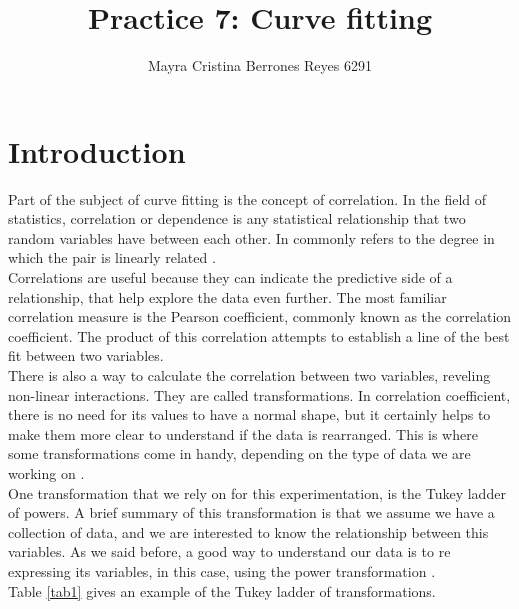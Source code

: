 \documentclass{article}
\begin{document}
\title{%
  Practice 7: Curve fitting} %
\author{Mayra Cristina Berrones Reyes 6291}

\maketitle

\section{Introduction}

Part of the subject of curve fitting is the concept of correlation. In the field of statistics, correlation or dependence is any statistical relationship that two random variables have between each other. In commonly refers to the degree in which the pair is linearly related \cite{stda}. \\

Correlations are useful because they can indicate the predictive side of a relationship, that help explore the data even further. The most familiar correlation measure is the Pearson coefficient, commonly known as the correlation coefficient. The product of this correlation attempts to establish a line of the best fit between two variables. \\

There is also a way to calculate the correlation between two variables, reveling non-linear interactions. They are called transformations. In correlation coefficient, there is no need for its values to have a normal shape, but it certainly helps to make them more clear to understand if the data is rearranged. This is where some transformations come in handy, depending on the type of data we are working on \cite{book1}.\\

One transformation that we rely on for this experimentation, is the Tukey ladder of powers. A brief summary of this transformation is that we assume we have a collection of data, and we are interested to know the relationship between this variables. As we said before, a good way to understand our data is to re expressing its variables, in this case, using the power transformation \cite{book1}.\\

Table \ref{tab1} gives an example of the Tukey ladder of transformations.\\
\end{document}
